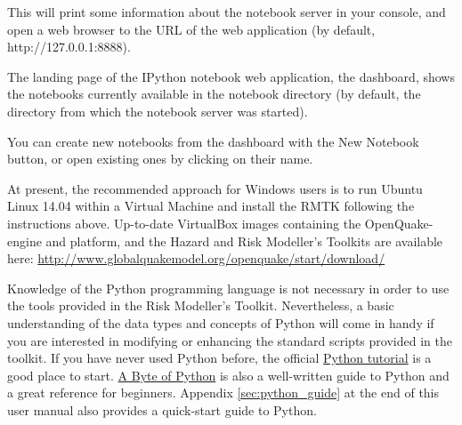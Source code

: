 This will print some information about the notebook server in your console, and open a web browser to the URL of the web application (by default, http://127.0.0.1:8888).

The landing page of the IPython notebook web application, the dashboard, shows the notebooks currently available in the notebook directory (by default, the directory from which the notebook server was started).

You can create new notebooks from the dashboard with the New Notebook button, or open existing ones by clicking on their name.

At present, the recommended approach for Windows users is to run Ubuntu Linux 14.04 within a Virtual Machine and install the RMTK following the instructions above. Up-to-date VirtualBox images containing the OpenQuake-engine and platform, and the Hazard and Risk Modeller's Toolkits are available here: \href{http://www.globalquakemodel.org/openquake/start/download/}{http://www.globalquakemodel.org/openquake/start/download/}

Knowledge of the Python programming language is not necessary in order to use the tools provided in the Risk Modeller's Toolkit. Nevertheless, a basic understanding of the data types and concepts of Python will come in handy if you are interested in modifying or enhancing the standard scripts provided in the toolkit. If you have never used Python before, the official \href{https://docs.python.org/2/tutorial/}{Python tutorial} is a good place to start. \href{http://www.swaroopch.com/notes/python/}{A Byte of Python} is also a well-written guide to Python and a great reference for beginners. Appendix \ref{sec:python_guide} at the end of this user manual also provides a quick-start guide to Python.